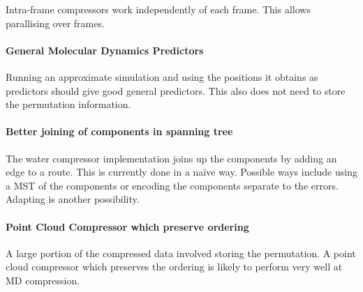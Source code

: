 \documentclass[a4paper]{report}
\begin{document}
Intra-frame compressors work independently of each frame. This allows
parallising over frames.

\paragraph{General Molecular Dynamics Predictors}

Running an approximate simulation and using the positions it obtains as
predictors should give good general predictors. This also does not need to
store the permutation information.

\paragraph{Better joining of components in spanning tree}

The water compressor implementation joins up the components by adding an edge
to a route. This is currently done in a na\"{i}ve way. Possible ways include
using a MST of the components or encoding the components separate to the
errors. Adapting \citep{chen2005lcp} is another possibility.

\paragraph{Point Cloud Compressor which preserve ordering}

A large portion of the compressed data involved storing the permutation. A
point cloud compressor which preserves the ordering is likely to perform very
well at MD compression.

\nocite{*}

\end{document}
